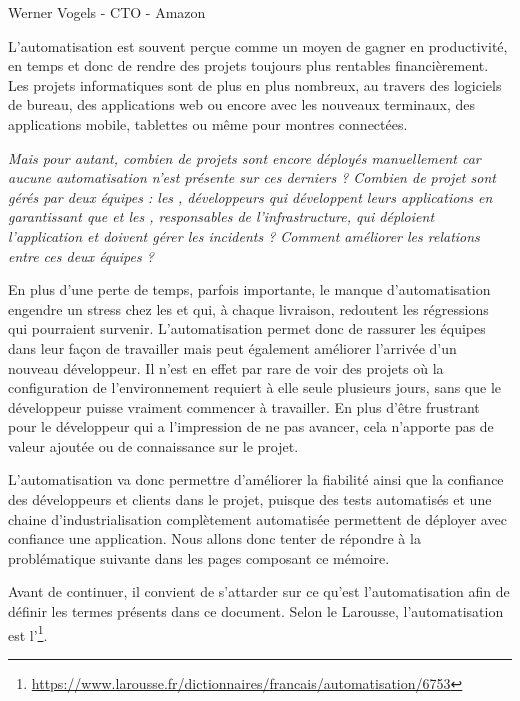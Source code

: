 \epigraph{}{Werner Vogels - \gls{CTO} - Amazon}

L'automatisation est souvent perçue comme un moyen de gagner en productivité, en temps et donc de rendre des projets toujours plus rentables financièrement. Les projets informatiques sont de plus en plus nombreux, au travers des logiciels de bureau, des applications web ou encore avec les nouveaux terminaux, des applications mobile, tablettes ou même pour montres connectées.
	
\emph{Mais pour autant, combien de projets sont encore déployés manuellement car aucune automatisation n'est présente sur ces derniers ? Combien de projet sont gérés par deux équipes : les \frquote{\dev}, développeurs qui développent leurs applications en garantissant que  et les \frquote{\ops}, responsables de l'infrastructure, qui déploient l'application et doivent gérer les incidents ? Comment améliorer les relations entre ces deux équipes ?}
	
En plus d'une perte de temps, parfois importante, le manque d'automatisation engendre un stress chez les \dev{} et \ops{} qui, à chaque livraison, redoutent les régressions qui pourraient survenir. L'automatisation permet donc de rassurer les équipes dans leur façon de travailler mais peut également améliorer l'arrivée d'un nouveau développeur. Il n'est en effet par rare de voir des projets où la configuration de l'environnement requiert à elle seule plusieurs jours, sans que le développeur puisse vraiment commencer à travailler. En plus d'être frustrant pour le développeur qui a l'impression de ne pas avancer, cela n'apporte pas de valeur ajoutée ou de connaissance sur le projet.

L'automatisation va donc permettre d'améliorer la fiabilité ainsi que la confiance des développeurs et clients dans le projet, puisque des tests automatisés et une chaine d'industrialisation complètement automatisée permettent de déployer avec confiance une application. Nous allons donc tenter de répondre à la problématique suivante dans les pages composant ce mémoire.

\hrulefill

{\large \problematique}

\hrulefill

Avant de continuer, il convient de s'attarder sur ce qu'est l'automatisation afin de définir les termes présents dans ce document. Selon le Larousse, l'automatisation est l'\footnote{\url{https://www.larousse.fr/dictionnaires/francais/automatisation/6753}}. 

